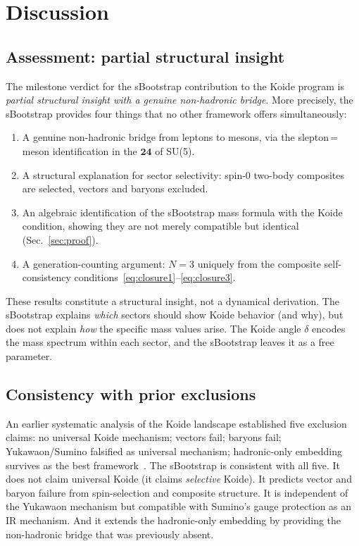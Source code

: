 \documentclass[prd,twocolumn,superscriptaddress,nofootinbib]{revtex4-2}
\begin{document}
\section{Discussion}
\label{sec:discussion}

\subsection{Assessment: partial structural insight}

The milestone verdict for the sBootstrap contribution to the Koide
program is \emph{partial structural insight with a genuine non-hadronic
bridge}.  More precisely, the sBootstrap provides four things that no
other framework offers simultaneously:
\begin{enumerate}
\item A genuine non-hadronic bridge from leptons to mesons, via the
  slepton\,=\,meson identification in the $\mathbf{24}$ of SU(5).
\item A structural explanation for sector selectivity: spin-0 two-body
  composites are selected, vectors and baryons excluded.
\item An algebraic identification of the sBootstrap mass formula with
  the Koide condition, showing they are not merely compatible but
  identical (Sec.~\ref{sec:proof}).
\item A generation-counting argument: $N=3$ uniquely from the composite
  self-consistency
  conditions~\eqref{eq:closure1}--\eqref{eq:closure3}.
\end{enumerate}
These results constitute a structural insight, not a dynamical
derivation.  The sBootstrap explains \emph{which} sectors should show
Koide behavior (and why), but does not explain \emph{how} the specific
mass values arise.  The Koide angle $\delta$ encodes the mass spectrum
within each sector, and the sBootstrap leaves it as a free parameter.

\subsection{Consistency with prior exclusions}

An earlier systematic analysis of the Koide landscape established five
exclusion claims: no universal Koide mechanism; vectors fail; baryons
fail; Yukawaon/Sumino falsified as universal mechanism; hadronic-only
embedding survives as the best framework~\cite{Rivero2013chain}.  The
sBootstrap is consistent with all five.  It does not claim universal
Koide (it claims \emph{selective} Koide).  It predicts vector and baryon
failure from spin-selection and composite structure.  It is independent
of the Yukawaon mechanism but compatible with Sumino's gauge protection
as an IR mechanism.  And it extends the hadronic-only embedding by
providing the non-hadronic bridge that was previously absent.
\end{document}
